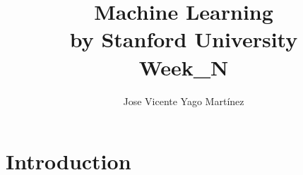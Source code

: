 \documentclass[12pt, A4,onecolumn]{article} %
\title{\textbf{Machine Learning\\ 
\small{by Stanford University}\\
Week\_N
}}
\author{
Jose Vicente Yago Martínez
}%
\begin{document}
\maketitle

	





\newpage
\tableofcontents

\newpage

\section{Introduction}

\end{document}
